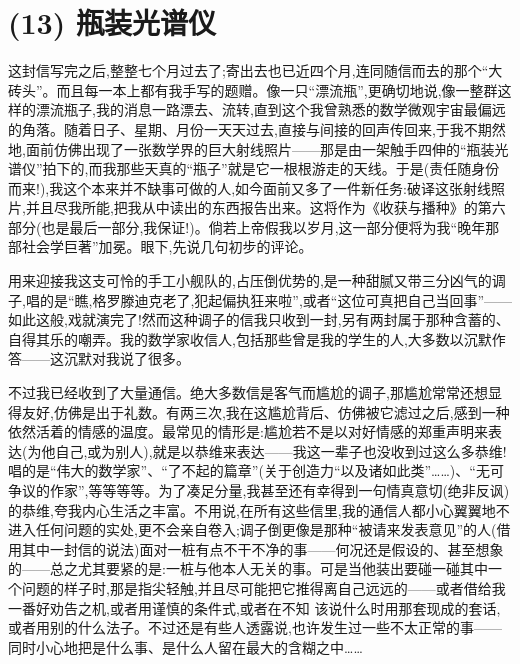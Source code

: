 \section{(13) 瓶装光谱仪}

这封信写完之后,整整七个月过去了;寄出去也已近四个月,连同随信而去的那个“大砖头”。而且每一本上都有我手写的题赠。像一只“漂流瓶”,更确切地说,像一整群这样的漂流瓶子,我的消息一路漂去、流转,直到这个我曾熟悉的数学微观宇宙最偏远的角落。随着日子、星期、月份一天天过去,直接与间接的回声传回来,于我不期然地,面前仿佛出现了一张数学界的巨大射线照片——那是由一架触手四伸的“瓶装光谱仪”拍下的,而我那些天真的“瓶子”就是它一根根游走的天线。于是(责任随身份而来!),我这个本来并不缺事可做的人,如今面前又多了一件新任务:破译这张射线照片,并且尽我所能,把我从中读出的东西报告出来。这将作为《收获与播种》的第六部分(也是最后一部分,我保证!)。倘若上帝假我以岁月,这一部分便将为我“晚年那部社会学巨著”加冕。眼下,先说几句初步的评论。

用来迎接我这支可怜的手工小舰队的,占压倒优势的,是一种甜腻又带三分凶气的调子,唱的是“瞧,格罗滕迪克老了,犯起偏执狂来啦”,或者“这位可真把自己当回事”——如此这般,戏就演完了!然而这种调子的信我只收到一封,另有两封属于那种含蓄的、自得其乐的嘲弄。我的数学家收信人,包括那些曾是我的学生的人,大多数以沉默作答——这沉默对我说了很多。

不过我已经收到了大量通信。绝大多数信是客气而尴尬的调子,那尴尬常常还想显得友好,仿佛是出于礼数。有两三次,我在这尴尬背后、仿佛被它滤过之后,感到一种依然活着的情感的温度。最常见的情形是:尴尬若不是以对好情感的郑重声明来表达(为他自己,或为别人),就是以恭维来表达——我这一辈子也没收到过这么多恭维!唱的是“伟大的数学家”、“了不起的篇章”(关于创造力“以及诸如此类”……)、“无可争议的作家”,等等等等。为了凑足分量,我甚至还有幸得到一句情真意切(绝非反讽)的恭维,夸我内心生活之丰富。不用说,在所有这些信里,我的通信人都小心翼翼地不进入任何问题的实处,更不会亲自卷入;调子倒更像是那种“被请来发表意见”的人(借用其中一封信的说法)面对一桩有点不干不净的事——何况还是假设的、甚至想象的——总之尤其要紧的是:一桩与他本人无关的事。可是当他装出要碰一碰其中一个问题的样子时,那是指尖轻触,并且尽可能把它推得离自己远远的——或者借给我一番好劝告之机,或者用谨慎的条件式,或者在不知%
该说什么时用那套现成的套话,或者用别的什么法子。不过还是有些人透露说,也许发生过一些不太正常的事——同时小心地把是什么事、是什么人留在最大的含糊之中……

